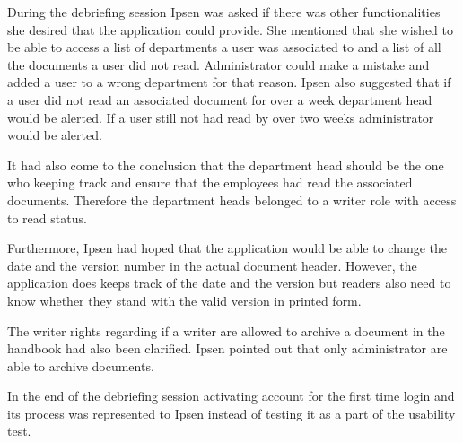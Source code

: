 
During the debriefing session Ipsen was asked if there was other functionalities she desired that the application could provide.
She mentioned that she wished to be able to access a list of departments a user was associated to and a list of all the documents a user did not read.
Administrator could make a mistake and added a user to a wrong department for that reason.
Ipsen also suggested that if a user did not read an associated document for over a week department head would be alerted.
If a user still not had read by over two weeks administrator would be alerted.

It had also come to the conclusion that the department head should be the one who keeping track and ensure that the employees had read the associated documents.
Therefore the department heads belonged to a writer role with access to read status.

Furthermore, Ipsen had hoped that the application would be able to change the date and the version number in the actual document header.
However, the application does keeps track of the date and the version but readers also need to know whether they stand with the valid version in printed form.

The writer rights regarding if a writer are allowed to archive a document in the handbook had also been clarified.
Ipsen pointed out that only administrator are able to archive documents.

In the end of the debriefing session activating account for the first time login and its process was represented to Ipsen instead of testing it as a part of the usability test.



